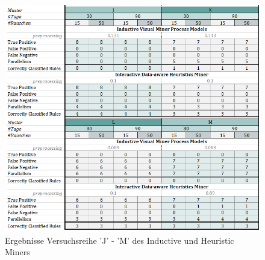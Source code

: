 \begin{figure}[!ht]
    \centering
    \includegraphics[width=\textwidth]{figures/Appbildungen/tab3.PNG}
    \caption{Ergebnisse Versuchsreihe 'J' - 'M' des Inductive und Heuristic Miners}
    \label{tab3}
\end{figure}

\clearpage
